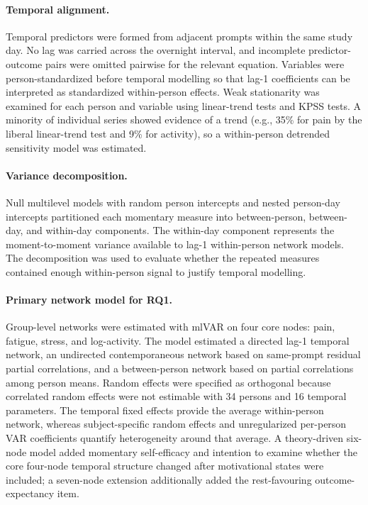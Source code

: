 \documentclass[11pt,a4paper]{article}
\begin{document}
\paragraph{Temporal alignment.} Temporal predictors were formed from
adjacent prompts within the same study day. No lag was carried across the overnight interval,
and incomplete predictor-outcome pairs were omitted pairwise for the relevant equation.
Variables were person-standardized before temporal modelling so that lag-1 coefficients can
be interpreted as standardized within-person effects. Weak stationarity was examined for
each person and variable using linear-trend tests and KPSS tests. A minority of individual
series showed evidence of a trend (e.g., 35\% for pain by the liberal linear-trend test and
9\% for activity), so a within-person detrended sensitivity model was estimated.

\paragraph{Variance decomposition.} Null multilevel models with random person intercepts and
nested person-day intercepts \citep{bates2015lme4} partitioned each momentary measure into
between-person, between-day, and within-day components. The within-day component represents
the moment-to-moment variance available to lag-1 within-person network models. The
decomposition was used to evaluate whether the repeated measures contained enough
within-person signal to justify temporal modelling.

\paragraph{Primary network model for RQ1.} Group-level networks were estimated with mlVAR
\citep{epskamp2018gaussian} on four core nodes: pain, fatigue, stress, and log-activity. The
model estimated a directed lag-1 temporal network, an undirected contemporaneous network
based on same-prompt residual partial correlations, and a between-person network based on
partial correlations among person means. Random effects were specified as orthogonal because
correlated random effects were not estimable with 34 persons and 16 temporal parameters.
The temporal fixed effects provide the average within-person network, whereas
subject-specific random effects and unregularized per-person VAR coefficients quantify
heterogeneity around that average. A theory-driven six-node model added momentary
self-efficacy and intention to examine whether the core four-node temporal structure changed
after motivational states were included; a seven-node extension additionally added the
rest-favouring outcome-expectancy item.
\end{document}
